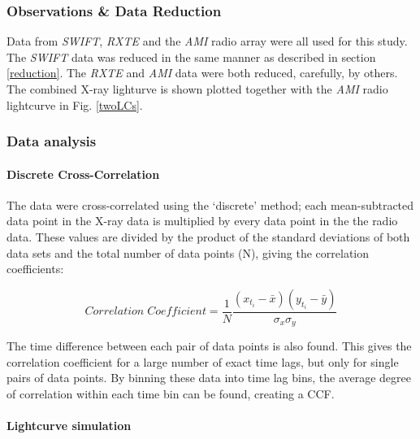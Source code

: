 \documentclass[letters,useAMS,usenatbib]{samnote}
\begin{document}

\subsubsection{Observations \& Data Reduction}

Data from {\it SWIFT}, {\it RXTE} and the {\it AMI} radio array were all used for this study. The {\it SWIFT} data was reduced in the same manner as described in section
\ref{reduction}. The {\it RXTE} and {\it AMI} data were both reduced, carefully, by others. The combined X-ray lighturve is shown plotted together with the {\it AMI}
radio lightcurve in Fig. \ref{twoLCs}. 

 

\subsubsection{Data analysis}

\paragraph{Discrete Cross-Correlation}

The data were cross-correlated using the `discrete' method; each mean-subtracted data point in the X-ray
data is multiplied by every data point in the the radio data. These values are divided by the product of the standard
deviations of both data sets and the total number of data points (N), giving the correlation coefficients:

\begin{equation}
Correlation\;Coefficient = \frac{1}{N} \frac{(x_{t_i} - \bar{x}) (y_{t_i} - \bar{y})}{\sigma_x \sigma_y} 
\end{equation}
\hspace{2cm}

The time difference between each pair of data points is also found. This gives the correlation coefficient for a large number of exact time
lags, but only for single pairs of data points. By binning these data into time lag bins, the average degree of correlation within each time bin can be
found, creating a CCF. 


\paragraph{Lightcurve simulation}
\end{document}
